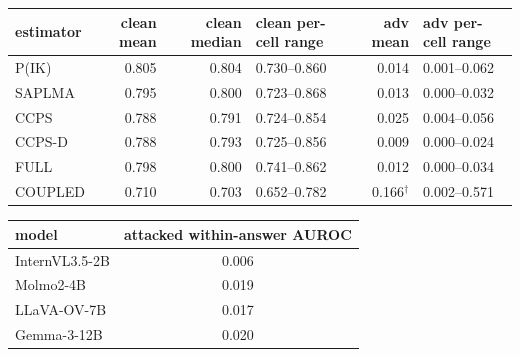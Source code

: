 \footnotesize
\setlength{\tabcolsep}{4pt}
\begin{tabular}{@{}lrrlrl@{}}
\toprule
estimator & clean mean & clean median & clean per-cell range & adv mean & adv per-cell range \\
\midrule
P(IK) & 0.805 & 0.804 & 0.730--0.860 & 0.014 & 0.001--0.062 \\
SAPLMA & 0.795 & 0.800 & 0.723--0.868 & 0.013 & 0.000--0.032 \\
CCPS & 0.788 & 0.791 & 0.724--0.854 & 0.025 & 0.004--0.056 \\
CCPS-D & 0.788 & 0.793 & 0.725--0.856 & 0.009 & 0.000--0.024 \\
\midrule
FULL & 0.798 & 0.800 & 0.741--0.862 & 0.012 & 0.000--0.034 \\
COUPLED & 0.710 & 0.703 & 0.652--0.782 & 0.166$^{\dagger}$ & 0.002--0.571 \\
\bottomrule
\end{tabular}

\vspace{4pt}
\footnotesize
\begin{tabular}{@{}lc@{}}
\toprule
model & attacked within-answer AUROC \\
\midrule
InternVL3.5-2B & 0.006 \\
Molmo2-4B & 0.019 \\
LLaVA-OV-7B & 0.017 \\
Gemma-3-12B & 0.020 \\
\bottomrule
\end{tabular}
